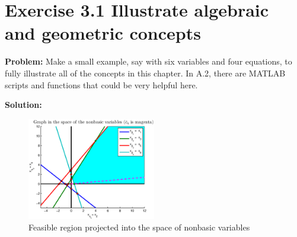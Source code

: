 
\section{Exercise 3.1 Illustrate algebraic and geometric concepts}
\textbf{Problem:} Make a small example, say with six variables and four equations, to fully illustrate all of the concepts in this chapter. In A.2, there are MATLAB scripts and functions that could be very helpful here.

\textbf{Solution:}

\begin{figure}[h!!]
\includegraphics[width=0.5\textwidth]{p1/p1.eps}
\caption{Feasible region projected into the space of nonbasic variables}\label{fig:p1}
\end{figure}
